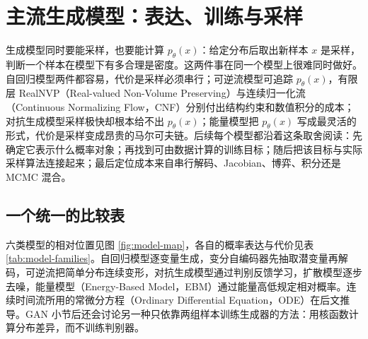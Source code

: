 \chapter{主流生成模型：表达、训练与采样}
\label{chap:model-families}

\begin{keybox}
生成模型同时要能采样，也要能计算 \(p_\theta(x)\)：给定分布后取出新样本 \(x\) 是采样，判断一个样本在模型下有多合理是密度。这两件事在同一个模型上很难同时做好。自回归模型两件都容易，代价是采样必须串行；可逆流模型可追踪 \(p_\theta(x)\)，有限层 RealNVP（Real-valued Non-Volume Preserving）与连续归一化流（Continuous Normalizing Flow，CNF）分别付出结构约束和数值积分的成本；对抗生成模型采样极快却根本给不出 \(p_\theta(x)\)；能量模型把 \(p_\theta(x)\) 写成最灵活的形式，代价是采样变成昂贵的马尔可夫链。后续每个模型都沿着这条取舍阅读：先确定它表示什么概率对象；再找到可由数据计算的训练目标；随后把该目标与实际采样算法连接起来；最后定位成本来自串行解码、Jacobian、博弈、积分还是 MCMC 混合。
\end{keybox}

\section{一个统一的比较表}

六类模型的相对位置见图 \ref{fig:model-map}，各自的概率表达与代价见表 \ref{tab:model-families}。自回归模型逐变量生成，变分自编码器先抽取潜变量再解码，可逆流把简单分布连续变形，对抗生成模型通过判别反馈学习，扩散模型逐步去噪，能量模型（Energy-Based Model，EBM）通过能量高低规定相对概率。连续时间流所用的常微分方程（Ordinary Differential Equation，ODE）在后文推导。GAN 小节后还会讨论另一种只依靠两组样本训练生成器的方法：用核函数计算分布差异，而不训练判别器。


